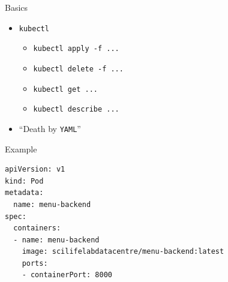 \documentclass{dcpresentation}
\begin{document}
 \begin{frame}{Basics}
  \begin{itemize}
   \item \texttt{kubectl}
   \begin{itemize}
    \item \texttt{kubectl apply -f ...}
    \item \texttt{kubectl delete -f ...}
    \item \texttt{kubectl get ...}
    \item \texttt{kubectl describe ...}
   \end{itemize}
   \item ``Death by \texttt{YAML}''
  \end{itemize}
 \end{frame}
  
 \begin{frame}[fragile]{Example}
  \small
  \begin{verbatim}
apiVersion: v1
kind: Pod
metadata:
  name: menu-backend
spec:
  containers:
  - name: menu-backend
    image: scilifelabdatacentre/menu-backend:latest
    ports:
    - containerPort: 8000
  \end{verbatim}
 \end{frame}
 
\end{document}
